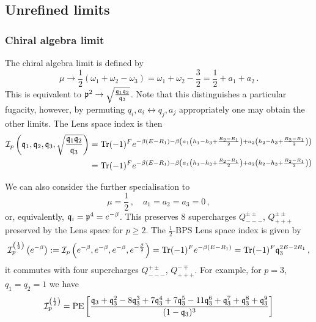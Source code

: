 \documentclass[main.tex]{subfiles}
\begin{document}
\subsection{ Unrefined limits}
\subsubsection{Chiral algebra limit}
The chiral algebra limit is defined by
\begin{equation}
\mu\to\frac{1}{2}(\omega_1+\omega_2-\omega_3)=\omega_1+\omega_2-\frac{3}{2}=\frac{1}{2}+a_1+a_2\,.
\end{equation} 
This is equivalent to $\mathfrak{p}^2\to\sqrt{\frac{\mathfrak{q}_1\mathfrak{q}_2}{\mathfrak{q}_3}}$. Note that this distinguishes a particular fugacity, however, by permuting $q_i,a_i\leftrightarrow q_j,a_j$ appropriately one may obtain the other limits. The Lens space index is then
\begin{equation}
\begin{aligned}
\mathcal{I}_{p}\left(\mathfrak{q}_1,\mathfrak{q}_2,\mathfrak{q}_3,\sqrt{\frac{\mathfrak{q}_1\mathfrak{q}_2}{\mathfrak{q}_3}}\right)&=\operatorname{Tr}(-1)^Fe^{-\beta\left(E-R_1\right)-\beta\left(a_1\left(h_1-h_3+\frac{R_2-R_1}{2}\right)+a_2\left(h_2-h_3+\frac{R_2-R_1}{2}\right)\right)}\\
&=\operatorname{Tr}(-1)^Fe^{-\beta\left(E-R_1\right)-\beta\left(a_1\left(h_1-h_3+\frac{R_2-R_1}{2}\right)+a_2\left(h_2-h_3+\frac{R_2-R_1}{2}\right)\right)}
\end{aligned}
\end{equation}

We can also consider the further specialisation to
\begin{equation}
\mu=\frac{1}{2}\,,\quad a_1=a_2=a_3=0\,,
\end{equation}
or, equivalently, $\mathfrak{q}_i=\mathfrak{p}^4=e^{-\beta}$. This preserves $8$ supercharges $Q^{\pm\pm}_{---}$, $Q^{\pm\pm}_{+++}$ preserved by the Lens space for $p\geq 2$. The $\frac{1}{2}$-BPS Lens space index is given by
\begin{equation}
\mathcal{I}^{\left(\frac{1}{2}\right)}_{p}\left(e^{-\beta}\right):=\mathcal{I}_{p}\left(e^{-\beta},e^{-\beta},e^{-\beta},e^{-\frac{\beta}{2}}\right)=\operatorname{Tr}(-1)^Fe^{-\beta\left(E-R_1\right)}=\operatorname{Tr}(-1)^F\mathfrak{q}_3^{2E-2R_1}\,,
\end{equation}
it commutes with four supercharges $Q_{---}^{+\pm}$, $Q_{+++}^{-\mp}$. For example, for $p=3$, $q_1=q_2=1$ we have
\begin{equation}
\mathcal{I}^{\left(\frac{1}{2}\right)}_{p}=\operatorname{\mathrm{PE}}\left[\frac{\mathfrak{q}_3 +\mathfrak{q}^2_3 - 8 \mathfrak{q}_3^3 + 7 \mathfrak{q}_3^4 + 7 \mathfrak{q}_3^{5} - 
 11 \mathfrak{q}_3^{6} + \mathfrak{q}_3^{7} + \mathfrak{q}_3^{8} + \mathfrak{q}_3^{9}}{(1-\mathfrak{q}_3)^3}\right]
\end{equation}
\end{document}
